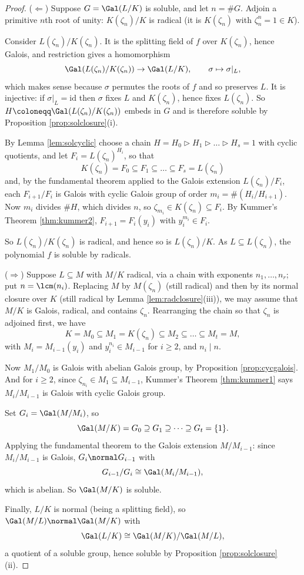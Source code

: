 \begin{proof}
	($\Leftarrow$) Suppose $G = \Gal(L/K)$ is soluble, and let $n = \#G$. Adjoin a primitive $n$th root of unity: $K(\zeta_n)/K$ is radical (it is $K(\zeta_n)$ with $\zeta_n^n = 1 \in K$).

	Consider $L(\zeta_n)/K(\zeta_n)$. It is the splitting field of $f$ over $K(\zeta_n)$, hence Galois, and restriction gives a homomorphism
	$$\Gal(L(\zeta_n)/K(\zeta_n)) \to \Gal(L/K), \qquad \sigma \mapsto \sigma|_L,$$
	which makes sense because $\sigma$ permutes the roots of $f$ and so preserves $L$. It is injective: if $\sigma|_L = \mathrm{id}$ then $\sigma$ fixes $L$ and $K(\zeta_n)$, hence fixes $L(\zeta_n)$. So $H \coloneqq \Gal(L(\zeta_n)/K(\zeta_n))$ embeds in $G$ and is therefore soluble by Proposition \ref{prop:solclosure}(i).

	By Lemma \ref{lem:solcyclic} choose a chain $H = H_0 \rhd H_1 \rhd\dots\rhd H_s = 1$ with cyclic quotients, and let $F_i = L(\zeta_n)^{H_i}$, so that
	$$K(\zeta_n) = F_0 \subseteq F_1 \subseteq \dots \subseteq F_s = L(\zeta_n)$$
	and, by the fundamental theorem applied to the Galois extension $L(\zeta_n)/F_i$, each $F_{i+1}/F_i$ is Galois with cyclic Galois group of order $m_i = \#(H_i/H_{i+1})$. Now $m_i$ divides $\#H$, which divides $n$, so $\zeta_{m_i} \in K(\zeta_n)\subseteq F_i$. By Kummer's Theorem \ref{thm:kummer2}, $F_{i+1} = F_i(y_i)$ with $y_i^{m_i}\in F_i$.

	So $L(\zeta_n)/K(\zeta_n)$ is radical, and hence so is $L(\zeta_n)/K$. As $L \subseteq L(\zeta_n)$, the polynomial $f$ is soluble by radicals.

	($\Rightarrow$) Suppose $L \subseteq M$ with $M/K$ radical, via a chain with exponents $n_1, \dots, n_r$; put $n = \lcm(n_i)$. Replacing $M$ by $M(\zeta_n)$ (still radical) and then by its normal closure over $K$ (still radical by Lemma \ref{lem:radclosure}(iii)), we may assume that $M/K$ is Galois, radical, and contains $\zeta_n$. Rearranging the chain so that $\zeta_n$ is adjoined first, we have
	$$K = M_0 \subseteq M_1 = K(\zeta_n)\subseteq M_2 \subseteq\dots\subseteq M_t = M,$$
	with $M_{i} = M_{i-1}(y_i)$ and $y_i^{n_i}\in M_{i-1}$ for $i \geq 2$, and $n_i \mid n$.

	Now $M_1/M_0$ is Galois with abelian Galois group, by Proposition \ref{prop:cycgalois}. And for $i \geq 2$, since $\zeta_{n_i}\in M_1 \subseteq M_{i-1}$, Kummer's Theorem \ref{thm:kummer1} says $M_i/M_{i-1}$ is Galois with cyclic Galois group.

	Set $G_i = \Gal(M/M_i)$, so
	$$\Gal(M/K) = G_0 \supseteq G_1 \supseteq \dots\supseteq G_t = \{1\}.$$
	Applying the fundamental theorem to the Galois extension $M/M_{i-1}$: since $M_i/M_{i-1}$ is Galois, $G_i \normal G_{i-1}$ with
	$$G_{i-1}/G_i \cong \Gal(M_i/M_{i-1}),$$
	which is abelian. So $\Gal(M/K)$ is soluble.

	Finally, $L/K$ is normal (being a splitting field), so $\Gal(M/L)\normal \Gal(M/K)$ with
	$$\Gal(L/K)\cong \Gal(M/K)/\Gal(M/L),$$
	a quotient of a soluble group, hence soluble by Proposition \ref{prop:solclosure}(ii).
\end{proof}

